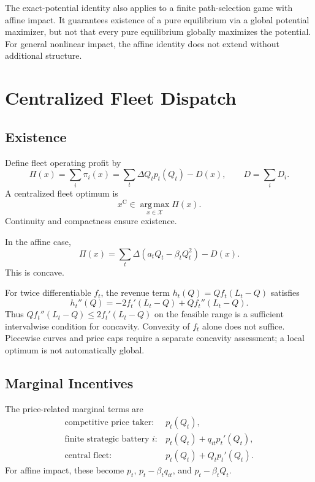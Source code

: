 \documentclass[11pt]{article}
\theoremstyle{remark}
\newcommand{\X}{\mathcal X}
\newcommand{\argmax}{\operatorname*{arg\,max}}
\newcommand{\cen}{\mathrm C}
\begin{document}
The exact-potential identity also applies to a finite path-selection game
with affine impact. It guarantees existence of a pure equilibrium via a
global potential maximizer, but not that every pure equilibrium globally
maximizes the potential. For general nonlinear impact, the affine identity
does not extend without additional structure.


\section{Centralized Fleet Dispatch}
\label{sec:central}

\subsection{Existence}
Define fleet operating profit by
\begin{equation}
 \Pi(x)=\sum_i\pi_i(x)
       =\sum_t\Delta Q_t p_t(Q_t)-D(x),\qquad D=\sum_iD_i.
 \label{eq:fleetprofit}
\end{equation}
A centralized fleet optimum is
\begin{equation}
 x^{\cen}\in\argmax_{x\in\X}\Pi(x).
 \label{eq:central}
\end{equation}
Continuity and compactness ensure existence.

In the affine case,
\begin{equation}
 \Pi(x)=\sum_t\Delta(a_tQ_t-\beta_tQ_t^2)-D(x).
 \label{eq:centralqp}
\end{equation}
This is concave. 

For twice differentiable $f_t$, the revenue term
$h_t(Q)=Qf_t(L_t-Q)$ satisfies
\begin{equation}
 h_t''(Q)=-2f_t'(L_t-Q)+Qf_t''(L_t-Q).
 \label{eq:curvature}
\end{equation}
Thus $Qf_t''(L_t-Q)\le2f_t'(L_t-Q)$ on the feasible range is a
sufficient intervalwise condition for concavity. Convexity of $f_t$ alone
does not suffice. Piecewise curves and price caps require a separate
concavity assessment; a local optimum is not automatically global.

\subsection{Marginal Incentives}

The price-related marginal terms are
\begin{equation}
 \begin{array}{ll}
 \text{competitive price taker:} & p_t(Q_t),\\[2pt]
 \text{finite strategic battery }i: & p_t(Q_t)+q_{it}p_t'(Q_t),\\[2pt]
 \text{central fleet:} & p_t(Q_t)+Q_tp_t'(Q_t).
 \end{array}
 \label{eq:marginals}
\end{equation}
For affine impact, these become $p_t$, $p_t-\beta_tq_{it}$, and
$p_t-\beta_tQ_t$.
\end{document}
